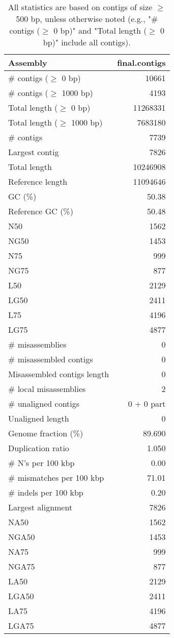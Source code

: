 \documentclass[12pt,a4paper]{article}
\begin{document}
\begin{table}[ht]
\begin{center}
\caption{All statistics are based on contigs of size $\geq$ 500 bp, unless otherwise noted (e.g., "\# contigs ($\geq$ 0 bp)" and "Total length ($\geq$ 0 bp)" include all contigs).}
\begin{tabular}{|l*{1}{|r}|}
\hline
Assembly & final.contigs \\ \hline
\# contigs ($\geq$ 0 bp) & 10661 \\ \hline
\# contigs ($\geq$ 1000 bp) & 4193 \\ \hline
Total length ($\geq$ 0 bp) & 11268331 \\ \hline
Total length ($\geq$ 1000 bp) & 7683180 \\ \hline
\# contigs & 7739 \\ \hline
Largest contig & 7826 \\ \hline
Total length & 10246908 \\ \hline
Reference length & 11094646 \\ \hline
GC (\%) & 50.38 \\ \hline
Reference GC (\%) & 50.48 \\ \hline
N50 & 1562 \\ \hline
NG50 & 1453 \\ \hline
N75 & 999 \\ \hline
NG75 & 877 \\ \hline
L50 & 2129 \\ \hline
LG50 & 2411 \\ \hline
L75 & 4196 \\ \hline
LG75 & 4877 \\ \hline
\# misassemblies & 0 \\ \hline
\# misassembled contigs & 0 \\ \hline
Misassembled contigs length & 0 \\ \hline
\# local misassemblies & 2 \\ \hline
\# unaligned contigs & 0 + 0 part \\ \hline
Unaligned length & 0 \\ \hline
Genome fraction (\%) & 89.690 \\ \hline
Duplication ratio & 1.050 \\ \hline
\# N's per 100 kbp & 0.00 \\ \hline
\# mismatches per 100 kbp & 71.01 \\ \hline
\# indels per 100 kbp & 0.20 \\ \hline
Largest alignment & 7826 \\ \hline
NA50 & 1562 \\ \hline
NGA50 & 1453 \\ \hline
NA75 & 999 \\ \hline
NGA75 & 877 \\ \hline
LA50 & 2129 \\ \hline
LGA50 & 2411 \\ \hline
LA75 & 4196 \\ \hline
LGA75 & 4877 \\ \hline
\end{tabular}
\end{center}
\end{table}
\end{document}
